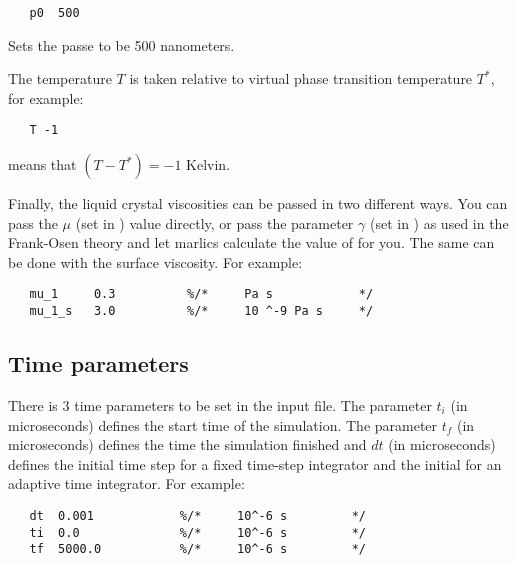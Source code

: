 \documentclass{article}
\begin{document}
\begin{lstlisting}
   p0  500
\end{lstlisting}
Sets the passe to be 500 nanometers.


The temperature $T$  is taken relative to virtual phase transition temperature $T^*$, for example:

\begin{lstlisting}
   T -1
\end{lstlisting}
means that $(T-T^*)=-1$ Kelvin.

Finally, the liquid crystal viscosities can be passed in two different ways. You can pass the $\mu$ (set in ) value directly, or pass the parameter $\gamma$ (set in ) as used in the Frank-Osen theory and let marlics calculate the value of  for you. The same can be done with the surface viscosity. For example:
\begin{lstlisting}
   mu_1     0.3          %/*     Pa s            */
   mu_1_s   3.0          %/*     10 ^-9 Pa s     */
\end{lstlisting}


\subsection{Time parameters}\label{time.param}

There is 3 time parameters to be set in the input file.  {The parameter $t_i$ (in microseconds) defines the start time of the simulation. The parameter $t_f$ (in microseconds) defines the time the simulation finished and $dt$ (in microseconds) defines the initial time step for a fixed time-step integrator and the initial for an adaptive time integrator}. For example:
\begin{lstlisting}
   dt  0.001            %/*     10^-6 s         */	
   ti  0.0              %/*     10^-6 s         */	
   tf  5000.0           %/*     10^-6 s         */
\end{lstlisting}
\end{document}

